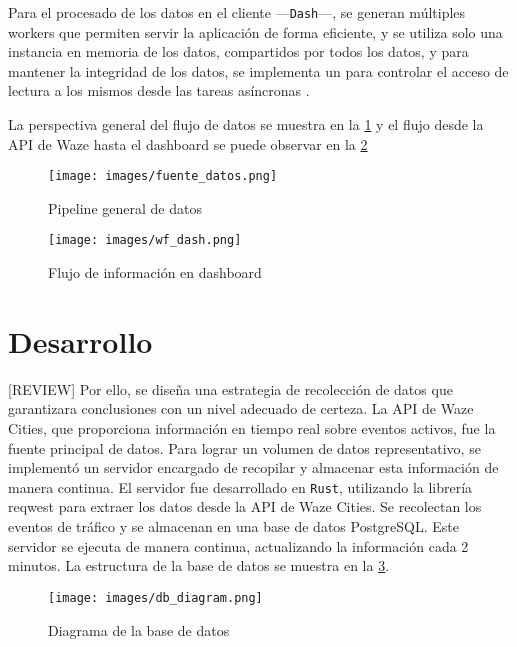 \documentclass[12pt]{article}
\begin{document}
{Para el procesado de los datos en el cliente —\texttt{Dash}—, se generan múltiples workers que permiten servir la aplicación de forma eficiente, y se utiliza solo una instancia en memoria de los datos, compartidos por todos los datos, y para mantener la integridad de los datos, se implementa un  para controlar el acceso de lectura a los mismos desde las tareas asíncronas \citep{ramalho2015fluent}.

La perspectiva general del flujo de datos se muestra en la \cref{fig:fuente} y el flujo desde la API de Waze hasta el dashboard se puede observar en la \cref{fig:wf_dash}

\begin{figure}[h]
    \centering
    \texttt{[image: images/fuente\_datos.png]}
    \caption{Pipeline general de datos}
    \label{fig:fuente}
\end{figure}

\begin{figure}[h]
    \centering
    \texttt{[image: images/wf\_dash.png]}
    \caption{Flujo de información en dashboard}
    \label{fig:wf_dash}
\end{figure}

\section{Desarrollo}

[REVIEW]
Por ello, se diseña una estrategia de recolección de datos que garantizara conclusiones con un nivel adecuado de certeza. La API de Waze Cities, que proporciona información en tiempo real sobre eventos activos, fue la fuente principal de datos. Para lograr un volumen de datos representativo, se implementó un servidor encargado de recopilar y almacenar esta información de manera continua. El servidor fue desarrollado en \texttt{Rust}, utilizando la librería reqwest \citep{reqwest2025} para extraer los datos desde la API de Waze Cities. Se recolectan los eventos de tráfico y se almacenan en una base de datos PostgreSQL. Este servidor se ejecuta de manera continua, actualizando la información cada 2 minutos. La estructura de la base de datos se muestra en la \cref{fig:db_diagram}.

\begin{figure}[H]
    \centering
    \texttt{[image: images/db\_diagram.png]}
    \caption{Diagrama de la base de datos}
    \label{fig:db_diagram}
\end{figure}

}
\end{document}
